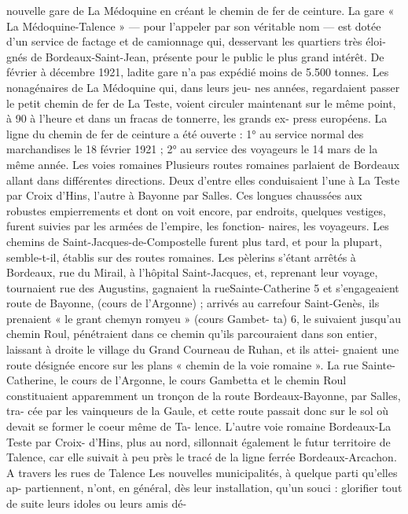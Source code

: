 \documentclass[a4paper,11pt]{book}
\begin{document}
nouvelle gare de La Médoquine en créant le chemin de fer
de ceinture.
La gare « La Médoquine-Talence
» — pour l'appeler
par son véritable nom — est dotée d'un service de factage
et de camionnage qui, desservant les quartiers très éloi-
gnés de Bordeaux-Saint-Jean, présente pour le public le
plus grand intérêt.
De février à décembre 1921, ladite gare n'a pas expédié
moins de 5.500 tonnes.
Les nonagénaires de La Médoquine qui, dans leurs jeu-
nes années, regardaient passer le petit chemin de fer de
La Teste, voient circuler maintenant
sur le même point, à
90 à l'heure et dans
un fracas de tonnerre, les grands ex-
press européens.
La ligne du chemin de fer de ceinture a été ouverte :
1° au service normal des marchandises le 18 février 1921
;
2° au service des
voyageurs le 14 mars de la même année.
Les voies romaines
Plusieurs routes romaines parlaient de Bordeaux allant
dans différentes directions. Deux d'entre elles conduisaient
l'une à La Teste
par Croix d'Hins, l'autre à Bayonne par
Salles. Ces longues chaussées aux robustes empierrements
et dont on voit encore, par endroits, quelques vestiges,
furent suivies
par les armées de l'empire, les fonction-
naires, les voyageurs.
Les chemins de Saint-Jacques-de-Compostelle furent
plus tard, et pour la plupart, semble-t-il, établis
sur des
routes romaines. Les pèlerins s'étant arrêtés à Bordeaux,
rue du Mirail, à l'hôpital Saint-Jacques, et, reprenant leur
voyage, tournaient rue des Augustins, gagnaient la rueSainte-Catherine 5 et s'engageaient route de Bayonne,
(cours de l'Argonne) ; arrivés au carrefour Saint-Genès,
ils prenaient « le grant chemyn romyeu » (cours Gambet-
ta) 6, le suivaient jusqu'au chemin Roul, pénétraient dans
ce chemin qu'ils parcouraient dans son entier, laissant à
droite le village du Grand Courneau de Ruhan, et ils attei-
gnaient une route désignée encore sur les plans « chemin
de la voie romaine ».
La rue Sainte-Catherine, le cours de l'Argonne, le cours
Gambetta et le chemin Roul constituaient apparemment
un tronçon de la route Bordeaux-Bayonne, par Salles, tra-
cée par les vainqueurs de la Gaule, et cette route passait
donc sur le sol où devait se former le coeur même de Ta-
lence.
L'autre voie romaine Bordeaux-La Teste par Croix-
d'Hins, plus au nord, sillonnait également le futur territoire
de Talence, car elle suivait à peu près le tracé de la ligne
ferrée Bordeaux-Arcachon.
A travers les rues de Talence
Les nouvelles municipalités, à quelque parti qu'elles ap-
partiennent, n'ont, en général, dès leur installation, qu'un
souci : glorifier tout de suite leurs idoles ou leurs amis dé-
\end{document}
